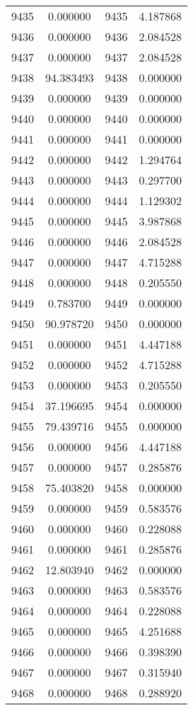 \documentclass[12pt]{article}
\begin{document}
\begin{longtable}{@{}cccc@{}}
9435 & 0.000000 & 9435 & 4.187868 \\
9436 & 0.000000 & 9436 & 2.084528 \\
9437 & 0.000000 & 9437 & 2.084528 \\
9438 & 94.383493 & 9438 & 0.000000 \\
9439 & 0.000000 & 9439 & 0.000000 \\
9440 & 0.000000 & 9440 & 0.000000 \\
9441 & 0.000000 & 9441 & 0.000000 \\
9442 & 0.000000 & 9442 & 1.294764 \\
9443 & 0.000000 & 9443 & 0.297700 \\
9444 & 0.000000 & 9444 & 1.129302 \\
9445 & 0.000000 & 9445 & 3.987868 \\
9446 & 0.000000 & 9446 & 2.084528 \\
9447 & 0.000000 & 9447 & 4.715288 \\
9448 & 0.000000 & 9448 & 0.205550 \\
9449 & 0.783700 & 9449 & 0.000000 \\
9450 & 90.978720 & 9450 & 0.000000 \\
9451 & 0.000000 & 9451 & 4.447188 \\
9452 & 0.000000 & 9452 & 4.715288 \\
9453 & 0.000000 & 9453 & 0.205550 \\
9454 & 37.196695 & 9454 & 0.000000 \\
9455 & 79.439716 & 9455 & 0.000000 \\
9456 & 0.000000 & 9456 & 4.447188 \\
9457 & 0.000000 & 9457 & 0.285876 \\
9458 & 75.403820 & 9458 & 0.000000 \\
9459 & 0.000000 & 9459 & 0.583576 \\
9460 & 0.000000 & 9460 & 0.228088 \\
9461 & 0.000000 & 9461 & 0.285876 \\
9462 & 12.803940 & 9462 & 0.000000 \\
9463 & 0.000000 & 9463 & 0.583576 \\
9464 & 0.000000 & 9464 & 0.228088 \\
9465 & 0.000000 & 9465 & 4.251688 \\
9466 & 0.000000 & 9466 & 0.398390 \\
9467 & 0.000000 & 9467 & 0.315940 \\
9468 & 0.000000 & 9468 & 0.288920 \\

\end{longtable}
\end{document}
